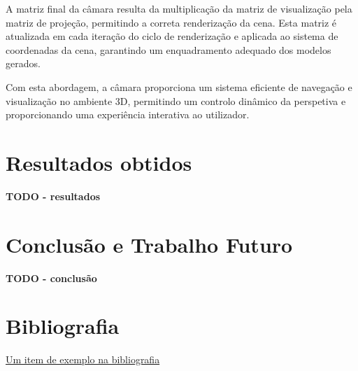 \documentclass[12pt, a4paper]{article}
\begin{document}
A matriz final da câmara resulta da multiplicação da matriz de visualização pela matriz de
projeção, permitindo a correta renderização da cena. Esta matriz é atualizada em cada iteração do
ciclo de renderização e aplicada ao sistema de coordenadas da cena, garantindo um enquadramento
adequado dos modelos gerados.

Com esta abordagem, a câmara proporciona um sistema eficiente de navegação e visualização no
ambiente 3D, permitindo um controlo dinâmico da perspetiva e proporcionando uma experiência
interativa ao utilizador.

\section{Resultados obtidos}

\textbf{\color{red} TODO - resultados}

\section{Conclusão e Trabalho Futuro}

\textbf{\color{red} TODO - conclusão}

\begingroup
\section{Bibliografia}
\renewcommand{\section}[2]{}

\begin{thebibliography}{9}
        \href{https://youtu.be/dQw4w9WgXcQ}{Um item de exemplo na bibliografia}
\end{thebibliography}
\endgroup
\end{document}
